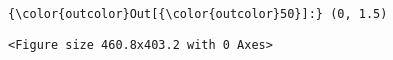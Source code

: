 \documentclass[11pt]{article}
\begin{document}
\begin{Verbatim}[commandchars=\\\{\}]
{\color{outcolor}Out[{\color{outcolor}50}]:} (0, 1.5)
\end{Verbatim}
            
    
    \begin{verbatim}
<Figure size 460.8x403.2 with 0 Axes>
    \end{verbatim}

    
    \begin{center}
    \end{center}
    { \hspace*{\fill} \\}
    

    
    
    
    
\end{document}
